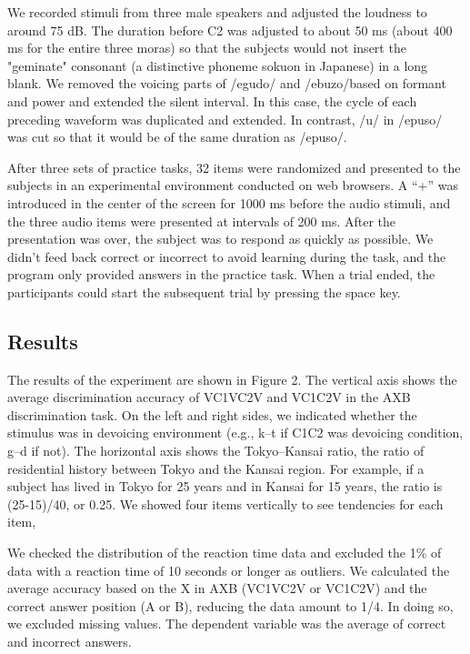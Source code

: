 \documentclass[a4paper,11pt,twocolumn]{article}
\begin{document}
We recorded stimuli from three male speakers and adjusted the loudness to around 75 dB. The duration before C2 was adjusted to about 50 ms (about 400 ms for the entire three moras) so that the subjects would not insert the "geminate" consonant (a distinctive phoneme sokuon in Japanese) in a long blank. We removed the voicing parts of /egudo/ and /ebuzo/based on formant and power and extended the silent interval. In this case, the cycle of each preceding waveform was duplicated and extended. In contrast, /u/ in /epuso/ was cut so that it would be of the same duration as /epuso/.

After three sets of practice tasks, 32 items were randomized and presented to the subjects in an experimental environment conducted on web browsers. A “+” was introduced in the center of the screen for 1000 ms before the audio stimuli, and the three audio items were presented at intervals of 200 ms. After the presentation was over, the subject was to respond as quickly as possible. We didn’t feed back correct or incorrect to avoid learning during the task, and the program only provided answers in the practice task. When a trial ended, the participants could start the subsequent trial by pressing the space key.

\subsection{Results}

The results of the experiment are shown in Figure 2. The vertical axis shows the average discrimination accuracy of VC1VC2V and VC1C2V in the AXB discrimination task. On the left and right sides, we indicated whether the stimulus was in devoicing environment (e.g., k--t if C1C2 was devoicing condition, g--d if not). The horizontal axis shows the Tokyo--Kansai ratio, the ratio of residential history between Tokyo and the Kansai region. For example, if a subject has lived in Tokyo for 25 years and in Kansai for 15 years, the ratio is (25-15)/40, or 0.25. We showed four items vertically to see tendencies for each item,

We checked the distribution of the reaction time data and excluded the 1\% of data with a reaction time of 10 seconds or longer as outliers. We calculated the average accuracy based on the X in AXB (VC1VC2V or VC1C2V) and the correct answer position (A or B), reducing the data amount to 1/4. In doing so, we excluded missing values. The dependent variable was the average of correct and incorrect answers.
\end{document}
